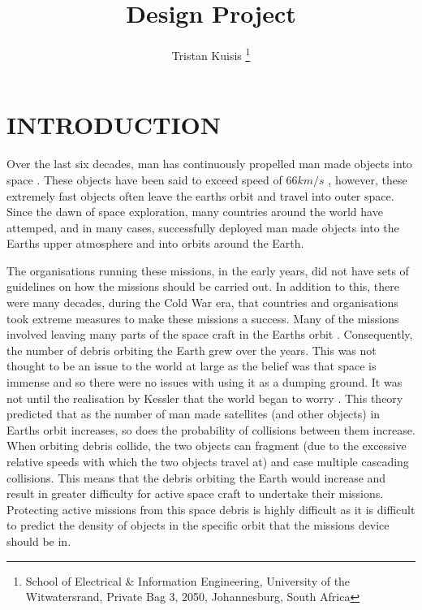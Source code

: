 \documentclass[11pt]{witseiepaper}
\begin{document}
\title{Design Project}
\author{Tristan Kuisis
\thanks{School of Electrical \& Information Engineering, University of the
Witwatersrand, Private Bag 3, 2050, Johannesburg, South Africa}
}


%



\maketitle
\thispagestyle{empty}\pagestyle{empty}


%




\section{INTRODUCTION} \label{sec:INTRODUCTION}

Over the last six decades, man has continuously propelled man made objects into space \cite{sputnik}. These objects have been said to exceed speed of $66 km/s$ \cite{fastestObject}, however, these extremely fast objects often leave the earths orbit and travel into outer space. Since the dawn of space exploration, many countries around the world have attemped, and in many cases, successfully deployed man made objects into the Earths upper atmosphere and into orbits around the Earth.

The organisations running these missions, in the early years, did not have sets of guidelines on how the missions should be carried out. In addition to this, there were many decades, during the Cold War era, that countries and organisations took extreme measures to make these missions a success. Many of the missions involved leaving many parts of the space craft in the Earths orbit \cite{spaceDebrisGuide}. Consequently, the number of debris orbiting the Earth grew over the years.
This was not thought to be an issue to the world at large as the belief was that space is immense and so there were no issues with using it as a dumping ground. It was not until the realisation by Kessler that the world began to worry \cite{Kessler}. This theory predicted that as the number of man made satellites (and other objects) in Earths orbit increases, so does the probability of collisions between them increase. When orbiting debris collide, the two objects can fragment (due to the excessive relative speeds with which the two objects travel at) and case multiple cascading collisions. This means that the debris orbiting the Earth would increase and result in greater difficulty for active space craft to undertake their missions.
Protecting active missions from this space debris is highly difficult as it is difficult to predict the density of objects in the specific orbit that the missions device should be in.
\end{document}
